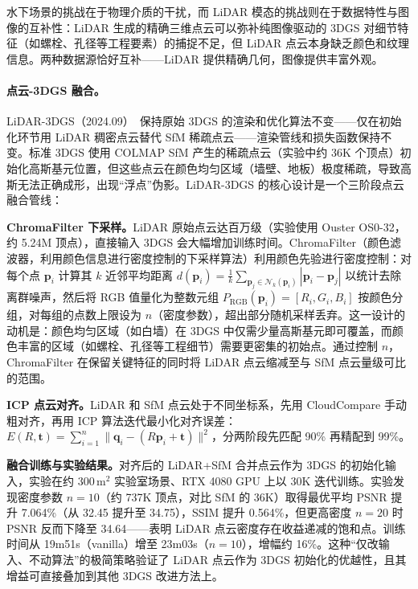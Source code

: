 水下场景的挑战在于物理介质的干扰，而 LiDAR 模态的挑战则在于数据特性与图像的互补性：LiDAR 生成的精确三维点云可以弥补纯图像驱动的 3DGS 对细节特征（如螺栓、孔径等工程要素）的捕捉不足，但 LiDAR 点云本身缺乏颜色和纹理信息。两种数据源恰好互补——LiDAR 提供精确几何，图像提供丰富外观。

\paragraph{点云-3DGS 融合。} LiDAR-3DGS（2024.09）~\cite{2409_16296}保持原始 3DGS 的渲染和优化算法不变——仅在初始化环节用 LiDAR 稠密点云替代 SfM 稀疏点云——渲染管线和损失函数保持不变。标准 3DGS 使用 COLMAP SfM 产生的稀疏点云（实验中约 36K 个顶点）初始化高斯基元位置，但这些点云在颜色均匀区域（墙壁、地板）极度稀疏，导致高斯无法正确成形，出现“浮点”伪影。LiDAR-3DGS 的核心设计是一个三阶段点云融合管线：

\textbf{ChromaFilter 下采样。}LiDAR 原始点云达百万级（实验使用 Ouster OS0-32，约 5.24M 顶点），直接输入 3DGS 会大幅增加训练时间。ChromaFilter（颜色滤波器，利用颜色信息进行密度控制的下采样算法）利用颜色先验进行密度控制：对每个点 $\mathbf{p}_i$ 计算其 $k$ 近邻平均距离 $d(\mathbf{p}_i) = \frac{1}{k}\sum_{\mathbf{p}_j \in \mathcal{N}_k(\mathbf{p}_i)}|\mathbf{p}_i - \mathbf{p}_j|$ 以统计去除离群噪声，然后将 RGB 值量化为整数元组 $P_{\mathrm{RGB}}(\mathbf{p}_i) = [R_i, G_i, B_i]$ 按颜色分组，对每组的点数上限设为 $n$（密度参数），超出部分随机采样丢弃。这一设计的动机是：颜色均匀区域（如白墙）在 3DGS 中仅需少量高斯基元即可覆盖，而颜色丰富的区域（如螺栓、孔径等工程细节）需要更密集的初始点。通过控制 $n$，ChromaFilter 在保留关键特征的同时将 LiDAR 点云缩减至与 SfM 点云量级可比的范围。

\textbf{ICP 点云对齐。}LiDAR 和 SfM 点云处于不同坐标系，先用 CloudCompare 手动粗对齐，再用 ICP 算法迭代最小化对齐误差：$E(R, \mathbf{t}) = \sum_{i=1}^{n}\|\mathbf{q}_i - (R\mathbf{p}_i + \mathbf{t})\|^2$，分两阶段先匹配 90\% 再精配到 99\%。

\textbf{融合训练与实验结果。}对齐后的 LiDAR+SfM 合并点云作为 3DGS 的初始化输入，实验在约 $300\,\mathrm{m}^2$ 实验室场景、RTX 4080 GPU 上以 30K 迭代训练。实验发现密度参数 $n=10$（约 737K 顶点，对比 SfM 的 36K）取得最优平均 PSNR 提升 7.064\%（从 32.45 提升至 34.75），SSIM 提升 0.564\%，但更高密度 $n=20$ 时 PSNR 反而下降至 34.64——表明 LiDAR 点云密度存在收益递减的饱和点。训练时间从 19m51s（vanilla）增至 23m03s（$n=10$），增幅约 16\%。这种“仅改输入、不动算法”的极简策略验证了 LiDAR 点云作为 3DGS 初始化的优越性，且其增益可直接叠加到其他 3DGS 改进方法上。

